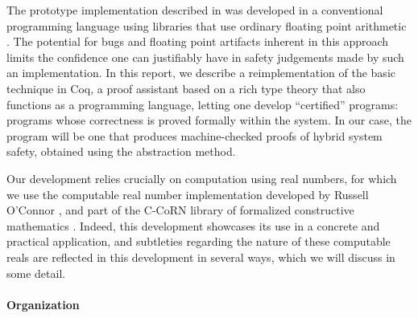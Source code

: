 \documentclass[runningheads]{llncs}
\begin{document}
The prototype implementation described in \cite{alur} was developed in a conventional programming language using libraries that use ordinary floating point arithmetic . The potential for bugs and floating point artifacts inherent in this approach limits the confidence one can justifiably have in safety judgements made by such an implementation. In this report, we describe a reimplementation of the basic technique in Coq, a proof assistant based on a rich type theory that also functions as a programming language, letting one develop ``certified'' programs: programs whose correctness is proved formally within the system. In our case, the program will be one that produces machine-checked proofs of hybrid system safety, obtained using the abstraction method.

Our development relies crucially on computation using real numbers, for which we use the computable real number implementation developed by Russell O'Connor \cite{something}, and part of the C-CoRN library of formalized constructive mathematics \cite{something}. Indeed, this development showcases its use in a concrete and practical application, and subtleties regarding the nature of these computable reals are reflected in this development in several ways, which we will discuss in some detail.









\paragraph{Organization}
\end{document}

